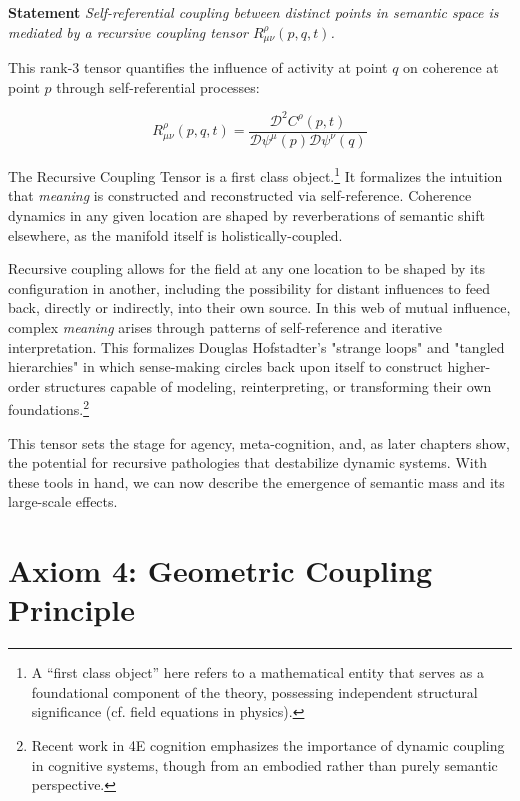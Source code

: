 \textbf{Statement} \textit{Self-referential coupling between distinct points in semantic space is mediated by a recursive coupling tensor \(R^\rho_{\mu\nu}(p,q,t)\).}

This rank-3 tensor quantifies the influence of activity at point \(q\) on coherence at point \(p\) through self-referential processes:

\begin{equation}
R^\rho_{\mu\nu}(p,q,t) = \frac{\mathcal{D}^2 C^\rho(p,t)}{\mathcal{D} \psi^\mu(p) \mathcal{D} \psi^\nu(q)}
\end{equation}

The Recursive Coupling Tensor is a first class object.\footnote{A “first class object” here refers to a mathematical entity that serves as a foundational component of the theory, possessing independent structural significance (cf. field equations in physics).} It formalizes the intuition that \textit{meaning} is constructed and reconstructed via self-reference. Coherence dynamics in any given location are shaped by reverberations of semantic shift elsewhere, as the manifold itself is holistically-coupled.

Recursive coupling allows for the field at any one location to be shaped by its configuration in another, including the possibility for distant influences to feed back, directly or indirectly, into their own source. In this web of mutual influence, complex \textit{meaning} arises through patterns of self-reference and iterative interpretation. This formalizes Douglas Hofstadter's "strange loops" and "tangled hierarchies" \autocite{Hofstadter1979, Hofstadter2007} in which sense-making circles back upon itself to construct higher-order structures capable of modeling, reinterpreting, or transforming their own foundations.\footnote{Recent work in 4E cognition \autocite{Newen2018, Gallagher2020} emphasizes the importance of dynamic coupling in cognitive systems, though from an embodied rather than purely semantic perspective.}

This tensor sets the stage for agency, meta-cognition, and, as later chapters show, the potential for recursive pathologies that destabilize dynamic systems. With these tools in hand, we can now describe the emergence of semantic mass and its large-scale effects.


\section{Axiom 4: Geometric Coupling Principle}
\label{1.4:axiom_4_geometric_coupling_principle}

